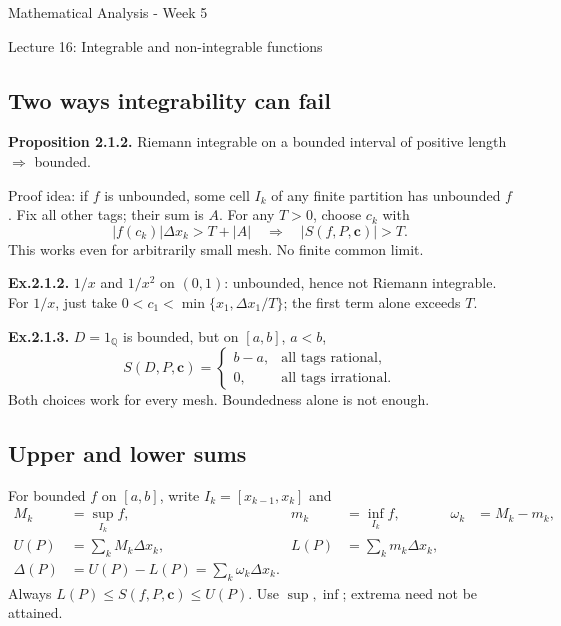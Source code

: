 \documentclass[11pt,letterpaper]{article}
\begin{document}
\begin{center}
{\LARGE Mathematical Analysis - Week 5\par}
\vspace{5pt}
{\large Lecture 16: Integrable and non-integrable functions\par}
\end{center}
\vspace{4pt}
\subsection{Two ways integrability can
fail}\label{two-ways-integrability-can-fail}

\textbf{Proposition 2.1.2.} Riemann integrable on a bounded interval of
positive length \(\Rightarrow\) bounded.

Proof idea: if \(f\) is unbounded, some cell \(I_k\) of any finite
partition has unbounded \(f\). Fix all other tags; their sum is \(A\).
For any \(T>0\), choose \(c_k\) with \[
|f(c_k)|\Delta x_k>T+|A|\quad\Rightarrow\quad |S(f,P,\mathbf c)|>T.
\] This works even for arbitrarily small mesh. No finite common limit.

\textbf{Ex.2.1.2.} \(1/x\) and \(1/x^2\) on \((0,1)\): unbounded, hence
not Riemann integrable. For \(1/x\), just take
\(0<c_1<\min\{x_1,\Delta x_1/T\}\); the first term alone exceeds \(T\).

\textbf{Ex.2.1.3.} \(D=1_{\mathbb Q}\) is bounded, but on \([a,b]\),
\(a<b\), \[
S(D,P,\mathbf c)=
\begin{cases}b-a,&\text{all tags rational},\\0,&\text{all tags irrational}.\end{cases}
\] Both choices work for every mesh. Boundedness alone is not enough.

\subsection{Upper and lower sums}\label{upper-and-lower-sums}

For bounded \(f\) on \([a,b]\), write \(I_k=[x_{k-1},x_k]\) and \[
\begin{aligned}
M_k&=\sup_{I_k}f,&m_k&=\inf_{I_k}f,&\omega_k&=M_k-m_k,\\
U(P)&=\sum_kM_k\Delta x_k,&L(P)&=\sum_km_k\Delta x_k,\\[-2pt]
\Delta(P)&=U(P)-L(P)=\sum_k\omega_k\Delta x_k.
\end{aligned}
\] Always \(L(P)\le S(f,P,\mathbf c)\le U(P)\). Use \(\sup,\inf\);
extrema need not be attained.
\end{document}
